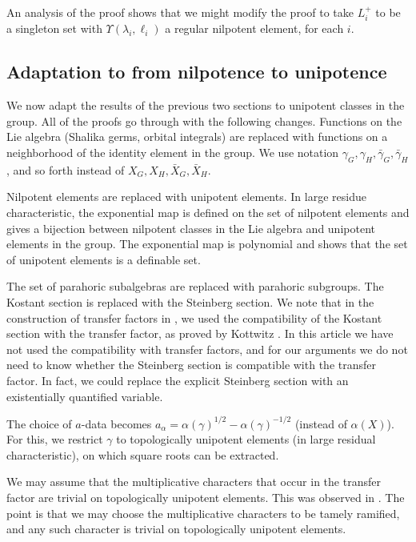 \documentclass[12pt]{amsart}
\def\Y{\Upsilon}
\theoremstyle{plain}
\theoremstyle{definition}
\begin{document}
An analysis of the proof shows that we might modify the proof to take
$L^+_i$ to be a singleton set with $\Y(\lambda_i,\ell_i)$
a regular nilpotent element, for each $i$.

\subsection{Adaptation to from nilpotence to unipotence}

We now adapt the results of the previous two sections to unipotent
classes in the group. All of the proofs go through with the following
changes.  Functions on the Lie algebra (Shalika germs, orbital
integrals) are replaced with functions on a neighborhood of the
identity element in the group.  We use notation
$\gamma_G,\gamma_H,\bar \gamma_G,\bar \gamma_H$, and so forth instead
of $X_G,X_H,\bar X_G,\bar X_H$.

Nilpotent elements are replaced with unipotent elements.  In large
residue characteristic,
the exponential map is defined on the set of nilpotent elements and
gives a bijection between nilpotent classes in the Lie algebra and
unipotent elements in the group.  The exponential map is polynomial
and shows that the set of unipotent elements is a definable set.

The set of parahoric subalgebras are replaced with parahoric
subgroups.  The Kostant section is replaced with the Steinberg
section.  We note that in the construction of transfer factors in
\cite{CHL}, we used the compatibility of the Kostant section with the
transfer factor, as proved by Kottwitz \cite{Kott}.  In this article
we have not used the compatibility with transfer factors, and for our
arguments we do not need to know whether the Steinberg section is
compatible with the transfer factor.  In fact, we could replace the
explicit Steinberg section with an existentially quantified variable.

The choice of $a$-data becomes $a_\alpha = \alpha(\gamma)^{1/2} -
\alpha(\gamma)^{-1/2}$ (instead of $\alpha(X)$).  For this, we
restrict $\gamma$ to topologically unipotent elements (in large
residual characteristic), on which square roots can be extracted.

We may assume that the multiplicative characters that occur in the
transfer factor are trivial on topologically unipotent elements.  This
was observed in \cite{hales1993simple}.  The point is that we may
choose the multiplicative characters to be tamely ramified, and any
such character is trivial on topologically unipotent elements.
\end{document}
